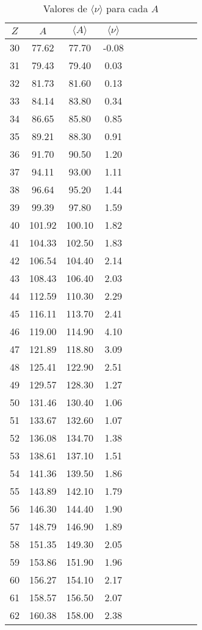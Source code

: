 \begin{table}[h!]
\caption{Valores de $\langle \nu \rangle $ para cada $A$}
\label{tab:tabla_nu}
\begin{tabular}{ccccccccccc}
\toprule
$Z$ & $A$ & $\langle A \rangle $ & $\langle \nu \rangle $ \\
\midrule
30 & 77.62 & 77.70 & -0.08 \\
31 & 79.43 & 79.40 & 0.03 \\
32 & 81.73 & 81.60 & 0.13 \\
33 & 84.14 & 83.80 & 0.34 \\
34 & 86.65 & 85.80 & 0.85 \\
35 & 89.21 & 88.30 & 0.91 \\
36 & 91.70 & 90.50 & 1.20 \\
37 & 94.11 & 93.00 & 1.11 \\
38 & 96.64 & 95.20 & 1.44 \\
39 & 99.39 & 97.80 & 1.59 \\
40 & 101.92 & 100.10 & 1.82 \\
41 & 104.33 & 102.50 & 1.83 \\
42 & 106.54 & 104.40 & 2.14 \\
43 & 108.43 & 106.40 & 2.03 \\
44 & 112.59 & 110.30 & 2.29 \\
45 & 116.11 & 113.70 & 2.41 \\
46 & 119.00 & 114.90 & 4.10 \\
47 & 121.89 & 118.80 & 3.09 \\
48 & 125.41 & 122.90 & 2.51 \\
49 & 129.57 & 128.30 & 1.27 \\
50 & 131.46 & 130.40 & 1.06 \\
51 & 133.67 & 132.60 & 1.07 \\
52 & 136.08 & 134.70 & 1.38 \\
53 & 138.61 & 137.10 & 1.51 \\
54 & 141.36 & 139.50 & 1.86 \\
55 & 143.89 & 142.10 & 1.79 \\
56 & 146.30 & 144.40 & 1.90 \\
57 & 148.79 & 146.90 & 1.89 \\
58 & 151.35 & 149.30 & 2.05 \\
59 & 153.86 & 151.90 & 1.96 \\
60 & 156.27 & 154.10 & 2.17 \\
61 & 158.57 & 156.50 & 2.07 \\
62 & 160.38 & 158.00 & 2.38 \\
\bottomrule
\end{tabular}
\end{table}
